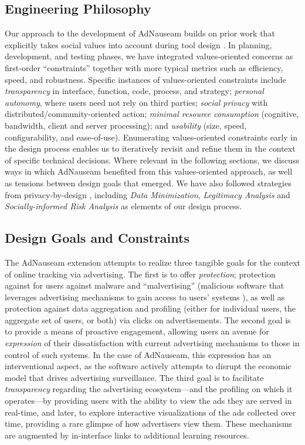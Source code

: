 \documentclass[conference]{IEEEtran}
\begin{document}
\subsection{Engineering Philosophy}

Our approach to the development of AdNauseam builds on prior work that explicitly takes social values into account during tool design \cite{Friedman,Flanagan,Howe-1}. In planning, development, and testing phases, we have integrated values-oriented concerns as first-order “constraints” together with more typical metrics such as efficiency, speed, and robustness. Specific instances of values-oriented constraints include \emph{transparency} in interface, function, code, process, and strategy; \emph{personal autonomy}, where users need not rely on third parties; \emph{social privacy} with distributed/community-oriented action; \emph{minimal resource consumption} (cognitive, bandwidth, client and server processing); and \emph{usability} (size, speed, configurability, and ease-of-use). Enumerating values-oriented constraints early in the design process enables us to iteratively revisit and refine them in the context of specific technical decisions. Where relevant in the following sections, we discuss ways in which AdNauseam benefited from this values-oriented approach, as well as tensions between design goals that emerged. We have also followed strategies from privacy-by-design \cite{Gurses-0,Hoepman,Gurses-1,Hansen,Cavoukian}, including \emph{Data Minimization}, \emph{Legitimacy Analysis} and \emph{Socially-informed Risk Analysis} as elements of our design process.

\subsection{Design Goals and Constraints}

The AdNauseam extension attempts to realize three tangible goals for the context of online tracking via advertising. The first is to offer \emph{protection}; protection against for users against malware and “malvertising” (malicious software that leverages advertising mechanisms to gain access to users' systems \cite{Mansfield}), as well as protection against data aggregation and profiling (either for individual users, the aggregate set of users, or both)  via clicks on advertisements. The second goal is to provide a means of proactive engagement, allowing users an avenue for \emph{expression} of their dissatisfaction with current advertising mechanisms to those in control of such systems. In the case of AdNauseam, this expression has an interventional aspect, as the software actively attempts to disrupt the economic model that drives advertising surveillance. The third goal is to facilitate \emph{transparency} regarding the advertising ecosystem---and the profiling on which it operates---by providing users with the ability to view the ads they are served in real-time, and later, to explore interactive visualizations of the ads collected over time, providing a rare glimpse of how advertisers view them. These mechanisms are augmented by in-interface links to additional learning resources.
\end{document}
